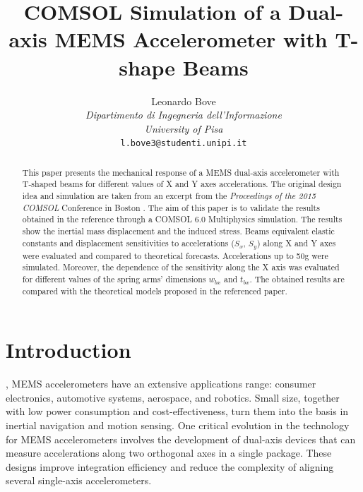 \documentclass[lettersize,journal]{IEEEtran}
\begin{document}
	
    \title{COMSOL Simulation of a Dual-axis MEMS Accelerometer with T-shape Beams}

    \author{Leonardo Bove\\
            \textit{Dipartimento di Ingegneria dell'Informazione}\\
            \textit{University of Pisa}\\
            \texttt{l.bove3@studenti.unipi.it}}

    \maketitle
	
    \begin{abstract}
        This paper presents the mechanical response of a MEMS dual-axis accelerometer with T-shaped beams for different values of X and Y axes accelerations. The original design idea and simulation are taken from an excerpt from the \textit{Proceedings of the 2015 COMSOL} Conference in Boston \cite{original}. The aim of this paper is to validate the results obtained in the reference through a COMSOL 6.0 Multiphysics simulation. The results show the inertial mass displacement and the induced stress. Beams equivalent elastic constants and displacement sensitivities to accelerations (\(S_{x}\), \(S_{y}\)) along X and Y axes were evaluated and compared to theoretical forecasts. Accelerations up to 50g were simulated. Moreover, the dependence of the  sensitivity along the X axis was evaluated for different values of the spring arms' dimensions \(w_{bx}\) and \(t_{bx}\). The obtained results are compared with the theoretical models proposed in the referenced paper.
    \end{abstract}
	
    \section{Introduction}
        , MEMS accelerometers have an extensive applications range: consumer electronics, automotive systems, aerospace, and robotics. Small size, together with low power consumption and cost-effectiveness, turn them into the basis in inertial navigation and motion sensing. One critical evolution in the technology for MEMS accelerometers involves the development of dual-axis devices that can measure accelerations along two orthogonal axes in a single package. These designs improve integration efficiency and reduce the complexity of aligning several single-axis accelerometers.
        
\end{document}
